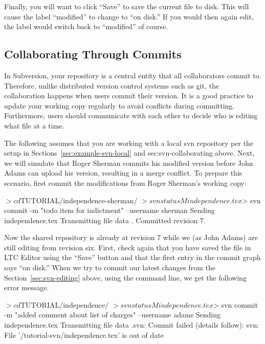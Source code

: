 Finally, you will want to click ``Save'' to save the current file to disk.  This will cause the label ``modified'' to change to ``on disk.''  If you would then again edit, the label would switch back to ``modified'' of course.

\subsection{Collaborating Through Commits}

In Subversion, your repository is a central entity that all collaborators commit to.  Therefore, unlike distributed version control systems such as git, the collaboration happens when users commit their version.  It is a good practice to update your working copy regularly to avoid conflicts during committing.  Furthermore, users should communicate with each other to decide who is editing what file at a time.

The following assumes that you are working with a local svn repository per the setup in Sections~\ref{sec:example-svn-local} and {sec:svn-collaborating} above.  Next, we will simulate that Roger Sherman commits his modified version before John Adams can upload his version, resulting in a merge conflict.  To prepare this scenario, first commit the modifications from Roger Sherman's working copy:
\begin{CodeVerbatim}[commandchars=\\\{\}]
$> cd $TUTORIAL/independence-sherman/
$> svn status
M       independence.tex
$> svn commit -m "todo item for indictment" --username sherman 
Sending        independence.tex
Transmitting file data .
Committed revision 7.
\end{CodeVerbatim}

Now the shared repository is already at revision 7 while we (as John Adams) are still editing from revision six.  First, check again that you have saved the file in LTC Editor using the ``Save'' button and that the first entry in the commit graph says ``on disk.'' When we try to commit our latest changes from the Section~\ref{sec:svn-editing} above, using the command line, we get the following error message.  
\begin{CodeVerbatim}[commandchars=\\\{\}]
$> cd $TUTORIAL/independence/
$> svn status
M       independence.tex
$> svn commit -m "added comment about list of charges" --username adams
Sending        independence.tex
Transmitting file data .svn: Commit failed (details follow):
svn: File '/tutorial-svn/independence.tex' is out of date
\end{CodeVerbatim}

